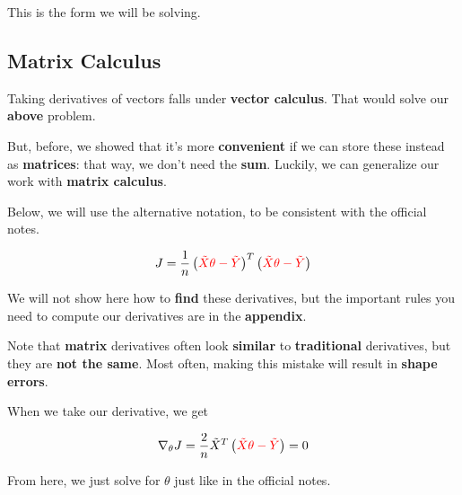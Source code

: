         
        This is the form we will be solving. 
        
    \subsection{Matrix Calculus}
    
        Taking derivatives of vectors falls under \textbf{vector calculus}. That would solve our \textbf{above} problem.
        
        But, before, we showed that it's more \textbf{convenient} if we can store these instead as \textbf{matrices}: that way, we don't need the \textbf{sum}. Luckily, we can generalize our work with \textbf{matrix calculus}. 
        
        Below, we will use the alternative notation, to be consistent with the official notes.
        
        \begin{equation}
            J = \frac{1}{n}
                \left( \textcolor{red}{ \tilde{X} \theta  - \tilde{Y} } \right)^T
                \left( \textcolor{red}{ \tilde{X} \theta  - \tilde{Y} } \right) 
        \end{equation}
        
        We will not show here how to \textbf{find} these derivatives, but the important rules you need to compute our derivatives are in the \textbf{appendix}.
        
        Note that \textbf{matrix} derivatives often look \textbf{similar} to \textbf{traditional} derivatives, but they are \textbf{not the same}. Most often, making this mistake will result in \textbf{shape errors}.
        
        When we take our derivative, we get
        
        \begin{equation}
            \nabla_\theta J = 
                \frac{2}{n} \tilde{X}^T
                \left( \textcolor{red}{ \tilde{X} \theta  - \tilde{Y} } \right) 
            =0
        \end{equation}
        
        From here, we just solve for $\theta$ just like in the official notes.\\
        
